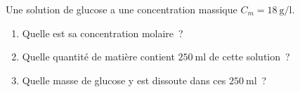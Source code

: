 \documentclass[11pt,a4paper]{article}
\begin{document}
\begin{exo}
Une solution de glucose  a une concentration massique $C_m = \SI{18}{\gram\per\litre}$.
\begin{enumerate}[label=\alph*)]
  \item Quelle est sa concentration molaire~?
  \item Quelle quantité de matière contient $\SI{250}{\milli\litre}$ de cette solution~?
  \item Quelle masse de glucose y est dissoute dans ces $\SI{250}{\milli\litre}$~?
\end{enumerate}
\end{exo}
\end{document}
